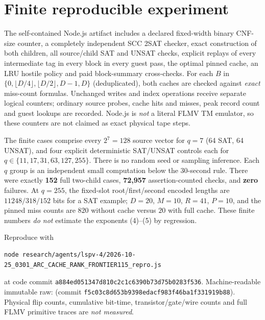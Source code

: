 \documentclass[11pt]{article}
\begin{document}
\section{Finite reproducible experiment}
The self-contained Node.js artifact includes a declared fixed-width
binary CNF-size counter, a completely independent SCC 2SAT
checker, exact construction of both children, all source/child
SAT and UNSAT checks, explicit replays of every intermediate
tag in every block in every guest pass, the optimal pinned cache,
an LRU hostile policy and paid block-summary cross-checks.
For each $B$ in $\{0,\lfloor D/4\rfloor,
\lfloor D/2\rfloor,D-1,D\}$ (deduplicated), both caches
are checked against \emph{exact} miss-count formulas.
Unchanged writes and index operations receive separate
logical counters; ordinary source probes, cache hits and
misses, peak record count and guest lookups are recorded.
Node.js is \emph{not} a literal FLMV TM emulator, so these
counters are not claimed as exact physical tape steps.

The finite cases comprise every $2^7=128$ source vector for $q=7$
(64 SAT, 64 UNSAT), and four explicit deterministic
SAT/UNSAT controls each for
$q\in\{11,17,31,63,127,255\}$.
There is no random seed or sampling inference. Each $q$ group
is an independent small computation below the 30-second rule.
There were exactly \textbf{152} full two-child cases,
\textbf{72,957} assertion-counted checks, and \textbf{zero}
failures. At $q=255$, the fixed-slot root/first/second
encoded lengths are $11248/318/152$ bits for a SAT example;
$D=20$, $M=10$, $R=41$, $P=10$,
and the pinned miss counts are $820$ without cache versus
$20$ with full cache. These finite numbers \emph{do not}
estimate the exponents (4)--(5) by regression.

Reproduce with
\begin{verbatim}
node research/agents/lspv-4/2026-10-25_0301_ARC_CACHE_RANK_FRONTIER115_repro.js
\end{verbatim}
at code commit
\texttt{a884ed051347d810c2c1c6390b73d75b0283f536}.
Machine-readable immutable raw:
(commit \texttt{f5c03c8d653b9398edacf983f46ba1f331919b88}).
Physical flip counts, cumulative bit-time, transistor/gate/wire
counts and full FLMV primitive traces are \emph{not measured}.
\end{document}
